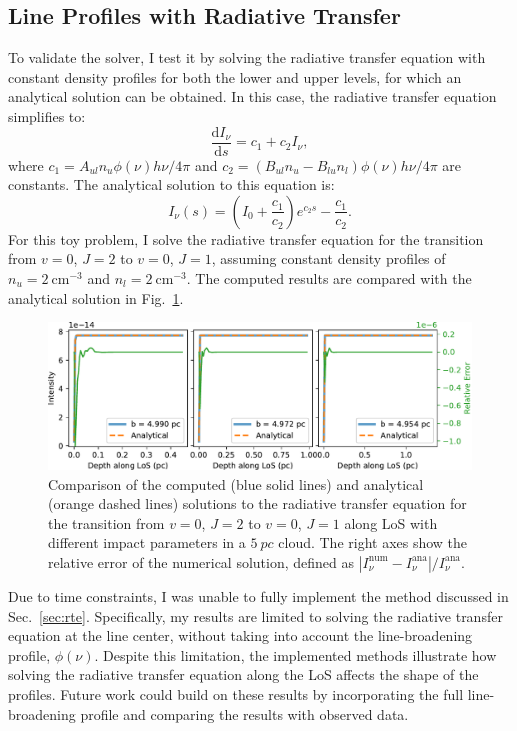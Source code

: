 \documentclass[12pt,a4paper]{article}
\newcommand{\fird}[2][]{\frac{\mathrm{d}#1}{\mathrm{d}#2}}
\begin{document}
\subsection{Line Profiles with Radiative Transfer} \label{sec:comprte}

To validate the solver, I test it by solving the radiative transfer equation with constant density profiles for both the lower and upper levels, for which an analytical solution can be obtained. In this case, the radiative transfer equation simplifies to:
\begin{equation}
    \fird[I_\nu]{s} = c_1  + c_2 I_\nu, \label{eq:simple_rte}
\end{equation} 
where $c_1 = A_{ul} n_u \phi(\nu) h\nu/4\pi$ and $c_2 = (B_{ul} n_u - B_{lu} n_l) \phi(\nu) h\nu/4\pi$ are constants. The analytical solution to this equation is:
\begin{equation}
    I_\nu (s) = (I_0 + \frac{c_1}{c_2})e^{c_2s} - \frac{c_1}{c_2}.
\end{equation}
For this toy problem, I solve the radiative transfer equation for the  transition from  \(v = 0\), \(J = 2\) to \(v = 0\), \(J = 1\), assuming constant density profiles of $n_u = \qty{2}{\cm^{-3}}$ and $n_l = \qty{2}{\cm^{-3}}$. The computed results are compared with the analytical solution in Fig.~\ref{fig:rtecstn}.

\begin{figure}[h]
    \centering
    \includegraphics[width=\textwidth,keepaspectratio]{rte_constant_density.pdf}
    \caption{Comparison of the computed (blue solid lines) and analytical (orange dashed lines) solutions to the radiative transfer equation for the  transition from \(v = 0\), \(J = 2\) to \(v = 0\), \(J = 1\) along LoS with different impact parameters in a \(\qty{5}{pc}\) cloud. The right axes show the relative error of the numerical solution, defined as $|I_\nu^\text{num} - I_\nu^\text{ana}|/I_\nu^\text{ana}$.} \label{fig:rtecstn}
\end{figure}

Due to time constraints, I was unable to fully implement the method discussed in Sec.~\ref{sec:rte}. Specifically, my results are limited to solving the radiative transfer equation at the line center, without taking into account the line-broadening profile, $\phi(\nu)$. Despite this limitation, the implemented methods illustrate how solving the radiative transfer equation along the LoS affects the shape of the profiles. Future work could build on these results by incorporating the full line-broadening profile and comparing the results with observed data.
\end{document}
